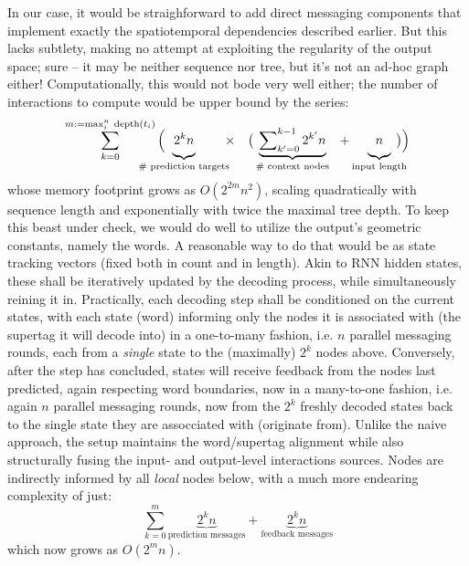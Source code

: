 In our case, it would be straighforward to add direct messaging components that implement exactly the spatiotemporal dependencies described earlier.
But this lacks subtlety, making no attempt at exploiting the regularity of the output space; sure -- it may be neither sequence nor tree, but it's not an ad-hoc graph either!
Computationally, this would not bode very well either; the number of interactions to compute would be upper bound by the series:
\begin{equation}\label{equation:dense_graph}
\sum_{k=0}^{m := \mathrm{max}_i^n ~ \mathrm{depth}(t_i)}
	\Big(
	\hspace{-22.5pt}
	\underbrace{\vphantom{\sum\nolimits_{k'}^{k}} 2^{k}n}_{\text{\# prediction targets}}
	\hspace{-5pt}
	\times
	~~~
	\big(
	\underbrace{\sum\nolimits_{k'=0}^{k-1} 2^{k'}n}_{\text{\# context nodes}}
	~~
	+ 
	\underbrace{\vphantom{\sum\nolimits_{k'}^{k}}  n}_{\text{input length}}
	\hspace{-10pt}
	\big)
	\Big)
\end{equation}
whose memory footprint grows as $O(2^{2m} n^2)$, scaling quadratically with sequence length and exponentially with twice the maximal tree depth.
To keep this beast under check, we would do well to utilize the output's geometric constants, namely the words.
A reasonable way to do that would be as state tracking vectors (fixed both in count and in length).
Akin to RNN hidden states, these shall be iteratively updated by the decoding process, while simultaneously reining it in.
Practically, each decoding step shall be conditioned on the current states, with each state (word) informing only the nodes it is associated with (the supertag it will decode into) in a one-to-many fashion, i.e. $n$ parallel messaging rounds, each from a \textit{single} state to the (maximally) $2^k$ nodes above.
Conversely, after the step has concluded, states will receive feedback from the nodes last predicted, again respecting word boundaries, now in a many-to-one fashion, i.e. again $n$ parallel messaging rounds, now from the $2^k$ freshly decoded states back to the single state they are assocciated with (originate from).
Unlike the naive approach, the setup maintains the word/supertag alignment while also structurally fusing the input- and output-level interactions sources.
Nodes are indirectly informed by all \textit{local} nodes below, with a much more endearing complexity of just:
\begin{equation}
\sum_{k=0}^{m}
	\underbrace{2^{k} n}_{\text{prediction messages}}
	+
	\underbrace{2^{k} n}_{\text{feedback messages}}
\end{equation}
which now grows as $O(2^m n)$.

